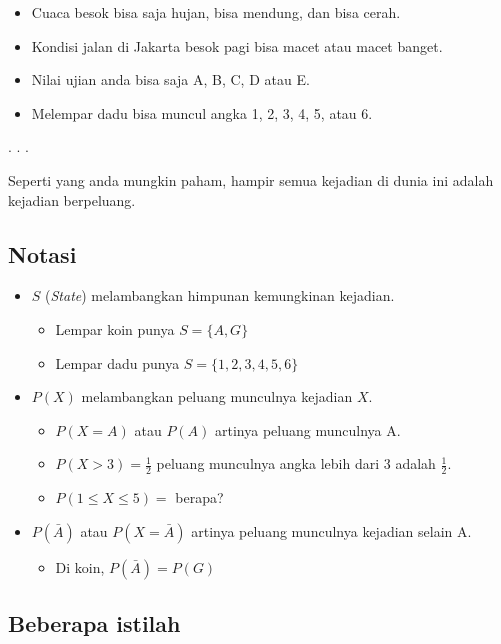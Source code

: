 \documentclass[
  letterpaper,
  DIV=11,
  numbers=noendperiod]{scrartcl}
\providecommand{\tightlist}{%
  \setlength{\itemsep}{0pt}\setlength{\parskip}{0pt}}\usepackage{longtable,booktabs,array}
\begin{document}
\begin{itemize}
\item
  Cuaca besok bisa saja hujan, bisa mendung, dan bisa cerah.
\item
  Kondisi jalan di Jakarta besok pagi bisa macet atau macet banget.
\item
  Nilai ujian anda bisa saja A, B, C, D atau E.
\item
  Melempar dadu bisa muncul angka 1, 2, 3, 4, 5, atau 6.
\end{itemize}

. . .

Seperti yang anda mungkin paham, hampir semua kejadian di dunia ini
adalah kejadian berpeluang.

\hypertarget{notasi-1}{%
\subsection{Notasi}\label{notasi-1}}

\begin{itemize}
\item
  \(S\) (\emph{State}) melambangkan himpunan kemungkinan kejadian.

  \begin{itemize}
  \item
    Lempar koin punya \(S=\{A,G\}\)
  \item
    Lempar dadu punya \(S=\{1,2,3,4,5,6\}\)
  \end{itemize}
\item
  \(P(X)\) melambangkan peluang munculnya kejadian \(X\).

  \begin{itemize}
  \item
    \(P(X=A)\) atau \(P(A)\) artinya peluang munculnya A.
  \item
    \(P(X>3)=\frac{1}{2}\) peluang munculnya angka lebih dari 3 adalah
    \(\frac{1}{2}\).
  \item
    \(P(1\leq X \leq 5)=\) berapa?
  \end{itemize}
\item
  \(P(\bar{A})\) atau \(P(X=\bar{A})\) artinya peluang munculnya
  kejadian selain A.

  \begin{itemize}
  \tightlist
  \item
    Di koin, \(P(\bar{A})=P(G)\)
  \end{itemize}
\end{itemize}

\hypertarget{beberapa-istilah}{%
\subsection{Beberapa istilah}\label{beberapa-istilah}}
\end{document}
